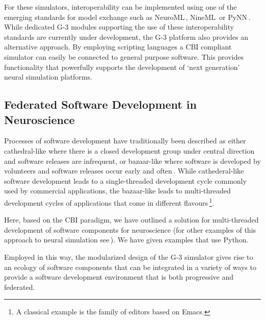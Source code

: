 \documentclass[10pt]{article}
\begin{document}
For these simulators, interoperability can be implemented using
one of the emerging standards for model exchange such as
NeuroML\,\cite{nigel01:_towar_neurom},
NineML\,\cite{gortechnikov10:_ninem_user_layer} or
PyNN\,\cite{davison08:_pynn}.  While dedicated G-3 modules supporting
the use of these interoperability standards are currently under
development, the G-3 platform also provides an alternative
approach. By employing scripting languages a CBI 
compliant simulator can easily be connected to general purpose software. 
This provides functionality that powerfully supports the development of 
`next generation' neural simulation platforms.

\subsection*{Federated Software Development in Neuroscience}

Processes of software development have traditionally been described as
either cathedral-like where there is a closed development group under
central direction and software releases are infrequent, or
bazaar-like where software is developed by
volunteers and software releases occur early and
often\,\cite{raymond01:_cathed_bazaar, citeulike:126678}.
While cathederal-like software development leads to a single-threaded
development cycle commonly used by commercial applications, the
bazaar-like leads to multi-threaded development cycles of
applications that come in different flavours\,\footnote{A classical
  example is the family of editors based on Emacs.}.

Here, based on the CBI paradigm, we have outlined a solution for
multi-threaded development of software components for neuroscience
(for other examples of this approach to neural simulation
see\,\cite{schuermann09:_neuron, nordlie09:_visual}).  We have given
examples that use Python.

Employed in this way, the modularized design of the G-3 simulator
gives rise to an ecology of software components that can be integrated
in a variety of ways to provide a software development environment
that is both progressive and federated.
\end{document}
